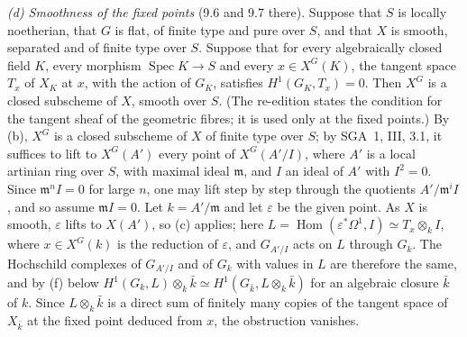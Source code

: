 \emph{(d) Smoothness of the fixed points} (9.6 and 9.7 there). Suppose that
\(S\) is locally noetherian, that \(G\) is flat, of finite type and pure over
\(S\), and that \(X\) is smooth, separated and of finite type over \(S\).
Suppose that for every algebraically closed field \(K\), every morphism
\(\operatorname{Spec}K\to S\) and every \(x\in X^G(K)\), the tangent space
\(T_x\) of \(X_K\) at \(x\), with the action of \(G_K\), satisfies
\(H^1(G_K,T_x)=0\). Then \(X^G\) is a closed subscheme of \(X\), smooth over
\(S\). (The re-edition states the condition for the tangent sheaf of the
geometric fibres; it is used only at the fixed points.) By (b), \(X^G\) is a
closed subscheme of \(X\) of finite type over \(S\); by SGA~1, III, 3.1, it
suffices to lift to \(X^G(A')\) every point of \(X^G(A'/I)\), where \(A'\)
is a local artinian ring over \(S\), with maximal ideal \(\mathfrak m\), and
\(I\) an ideal of \(A'\) with \(I^2=0\). Since \(\mathfrak m^nI=0\) for
large \(n\), one may lift step by step through the quotients
\(A'/\mathfrak m^iI\), and so assume \(\mathfrak mI=0\). Let \(k=A'/\mathfrak m\)
and let \(\varepsilon\) be the given point. As \(X\) is smooth,
\(\varepsilon\) lifts to \(X(A')\), so (c) applies; here
\(L=\operatorname{Hom}(\varepsilon^*\Omega^1,I)\simeq T_x\otimes_kI\), where
\(x\in X^G(k)\) is the reduction of \(\varepsilon\), and \(G_{A'/I}\) acts on
\(L\) through \(G_k\). The Hochschild complexes of \(G_{A'/I}\) and of
\(G_k\) with values in \(L\) are therefore the same, and by (f) below
\(H^1(G_k,L)\otimes_k\bar k\simeq H^1(G_{\bar k},L\otimes_k\bar k)\) for an
algebraic closure \(\bar k\) of \(k\). Since \(L\otimes_k\bar k\) is a
direct sum of finitely many copies of the tangent space of \(X_{\bar k}\) at
the fixed point deduced from \(x\), the obstruction vanishes.

